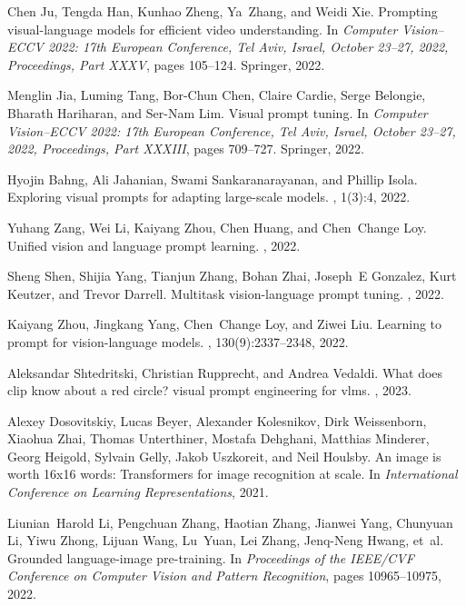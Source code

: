 {\begin{thebibliography}{10}
Chen Ju, Tengda Han, Kunhao Zheng, Ya~Zhang, and Weidi Xie.
\newblock Prompting visual-language models for efficient video understanding.
\newblock In {\em Computer Vision--ECCV 2022: 17th European Conference, Tel
  Aviv, Israel, October 23--27, 2022, Proceedings, Part XXXV}, pages 105--124.
  Springer, 2022.

Menglin Jia, Luming Tang, Bor-Chun Chen, Claire Cardie, Serge Belongie, Bharath
  Hariharan, and Ser-Nam Lim.
\newblock Visual prompt tuning.
\newblock In {\em Computer Vision--ECCV 2022: 17th European Conference, Tel
  Aviv, Israel, October 23--27, 2022, Proceedings, Part XXXIII}, pages
  709--727. Springer, 2022.

Hyojin Bahng, Ali Jahanian, Swami Sankaranarayanan, and Phillip Isola.
\newblock Exploring visual prompts for adapting large-scale models.
, 1(3):4, 2022.

Yuhang Zang, Wei Li, Kaiyang Zhou, Chen Huang, and Chen~Change Loy.
\newblock Unified vision and language prompt learning.
, 2022.

Sheng Shen, Shijia Yang, Tianjun Zhang, Bohan Zhai, Joseph~E Gonzalez, Kurt
  Keutzer, and Trevor Darrell.
\newblock Multitask vision-language prompt tuning.
, 2022.

Kaiyang Zhou, Jingkang Yang, Chen~Change Loy, and Ziwei Liu.
\newblock Learning to prompt for vision-language models.
, 130(9):2337--2348, 2022.

Aleksandar Shtedritski, Christian Rupprecht, and Andrea Vedaldi.
\newblock What does clip know about a red circle? visual prompt engineering for
  vlms.
, 2023.

Alexey Dosovitskiy, Lucas Beyer, Alexander Kolesnikov, Dirk Weissenborn,
  Xiaohua Zhai, Thomas Unterthiner, Mostafa Dehghani, Matthias Minderer, Georg
  Heigold, Sylvain Gelly, Jakob Uszkoreit, and Neil Houlsby.
\newblock An image is worth 16x16 words: Transformers for image recognition at
  scale.
\newblock In {\em International Conference on Learning Representations}, 2021.

Liunian~Harold Li, Pengchuan Zhang, Haotian Zhang, Jianwei Yang, Chunyuan Li,
  Yiwu Zhong, Lijuan Wang, Lu~Yuan, Lei Zhang, Jenq-Neng Hwang, et~al.
\newblock Grounded language-image pre-training.
\newblock In {\em Proceedings of the IEEE/CVF Conference on Computer Vision and
  Pattern Recognition}, pages 10965--10975, 2022.


\end{thebibliography}}
